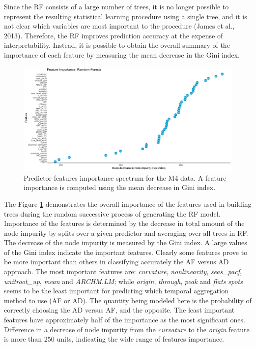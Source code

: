 \documentclass[]{elsarticle} %
\begin{document}
Since the RF consists of a large number of trees, it is no longer
possible to represent the resulting statistical learning procedure using
a single tree, and it is not clear which variables are most important to
the procedure (James et al., 2013). Therefore, the RF improves
prediction accuracy at the expense of interpretability. Instead, it is
possible to obtain the overall summary of the importance of each feature
by measuring the mean decrease in the Gini index.

\begin{figure}[H]

{\centering \includegraphics[width=0.95\linewidth]{img/300dpi/Fig_importance} 

}

\caption{Predictor features importance spectrum for the M4 data. A feature importance is computed using the mean decrease in Gini index.}\label{fig:RFpartial}
\end{figure}

The Figure \ref{fig:RFpartial} demonstrates the overall importance of
the features used in building trees during the random successive process
of generating the RF model. Importance of the features is determined by
the decrease in total amount of the node impurity by splits over a given
predictor and averaging over all trees in RF. The decrease of the node
impurity is measured by the Gini index. A large values of the Gini index
indicate the important features. Clearly some features prove to be more
important than others in classifying accurately the AF versus AD
approach. The most important features are: \emph{curvature},
\emph{nonlinearity}, \emph{seas\_pacf}, \emph{unitroot\_up}, \emph{mean}
and \emph{ARCHM.LM}; while \emph{origin}, \emph{through}, \emph{peak}
and \emph{flats spots} seems to be the least important for predicting
which temporal aggregation method to use (AF or AD). The quantity being
modeled here is the probability of correctly choosing the AD versus AF,
and the opposite. The least important features have approximately half
of the importance as the most significant ones. Difference in a decrease
of node impurity from the \emph{curvature} to the \emph{origin} feature
is more than 250 units, indicating the wide range of features
importance.
\end{document}
